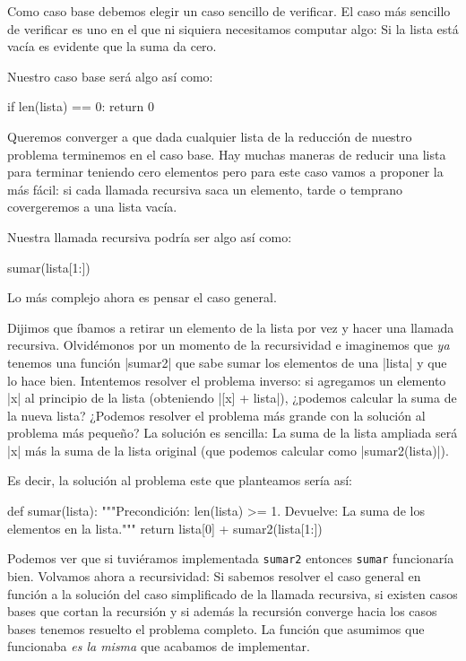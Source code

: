 Como caso base debemos elegir un caso sencillo de verificar. El caso más
sencillo de verificar es uno en el que ni siquiera necesitamos
computar algo: Si la lista está vacía es evidente que la suma da cero.

Nuestro caso base será algo así como:

\begin{codigo-python-sn}
    if len(lista) == 0:
        return 0
\end{codigo-python-sn}

Queremos converger a que dada cualquier lista de la reducción de nuestro
problema terminemos en el caso base. Hay muchas maneras de reducir una lista
para terminar teniendo cero elementos pero para este caso vamos a proponer la
más fácil: si cada llamada recursiva saca un elemento, tarde o temprano
covergeremos a una lista vacía.

Nuestra llamada recursiva podría ser algo así como:

\begin{codigo-python-sn}
   sumar(lista[1:])
\end{codigo-python-sn}

Lo más complejo ahora es pensar el caso general.

Dijimos que íbamos a retirar un elemento de la lista por vez y hacer una
llamada recursiva. Olvidémonos por un momento de la recursividad e imaginemos
que \emph{ya} tenemos una función |sumar2| que sabe sumar los elementos de una
|lista| y que lo hace bien.  Intentemos resolver el problema inverso: si
agregamos un elemento |x| al principio de la lista (obteniendo |[x] + lista|),
¿podemos calcular la suma de la nueva lista?  ¿Podemos resolver el problema más
grande con la solución al problema más pequeño? La solución es sencilla: La
suma de la lista ampliada será |x| más la suma de la lista original (que podemos
calcular como |sumar2(lista)|).

Es decir, la solución al problema este que planteamos sería así:
\begin{codigo-python-sn}
def sumar(lista):
   """Precondición: len(lista) >= 1.
      Devuelve: La suma de los elementos en la lista."""
   return lista[0] + sumar2(lista[1:])
\end{codigo-python-sn}

Podemos ver que si tuviéramos implementada \lstinline!sumar2! entonces
\lstinline!sumar! funcionaría bien. Volvamos ahora a recursividad: Si sabemos
resolver el caso general en función a la solución del caso simplificado de la
llamada recursiva, si existen casos bases que cortan la recursión y si además
la recursión converge hacia los casos bases tenemos resuelto el problema
completo. La función que asumimos que funcionaba \emph{es la misma} que
acabamos de implementar.


